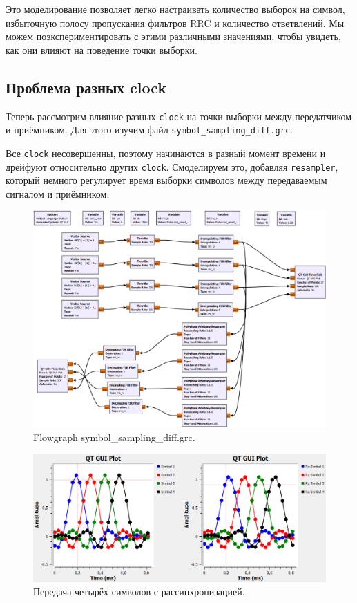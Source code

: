 \documentclass[a4paper, 14pt]{extarticle}
\begin{document}
    Это моделирование позволяет легко настраивать количество выборок на символ, избыточную полосу
    пропускания фильтров RRC и количество ответвлений.
    Мы можем поэкспериментировать с этими различными значениями, чтобы увидеть,
    как они влияют на поведение точки выборки.

    \newpage
    \subsection{Проблема разных clock}
    \label{subsec:task3_clock}

    Теперь рассмотрим влияние разных \texttt{clock} на точки выборки между передатчиком и приёмником.
    Для этого изучим файл \texttt{symbol\_sampling\_diff.grc}.

    Все \texttt{clock} несовершенны, поэтому начинаются в разный момент времени и дрейфуют относительно других \texttt{clock}.
    Смоделируем это, добавляя \texttt{resampler}, который немного регулирует время выборки символов между передаваемым
    сигналом и приёмником.

    \begin{figure}[h]
        \centering
        \includegraphics[width=0.8\linewidth]{resources/Images/task3_symbol_sampling_diff}
        \caption{Flowgraph symbol\_sampling\_diff.grc.}
        \label{fig:task3_symbol_sampling_diff}
    \end{figure}

    \begin{figure}[h]
        \centering
        \includegraphics[width=0.8\linewidth]{resources/Images/task3_desynchronization}
        \caption{Передача четырёх символов с рассинхронизацией.}
        \label{fig:task3_desynchronization}
    \end{figure}
\end{document}
